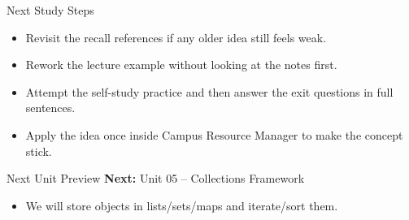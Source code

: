 \documentclass{beamer}
\begin{document}
\begin{frame}{Next Study Steps}
\begin{itemize}[<+->]
  \item Revisit the recall references if any older idea still feels weak.
  \item Rework the lecture example without looking at the notes first.
  \item Attempt the self-study practice and then answer the exit questions in full sentences.
  \item Apply the idea once inside Campus Resource Manager to make the concept stick.
\end{itemize}
  \slidesources{\OOPSUnitIVSources}
\end{frame}

\begin{frame}{Next Unit Preview}
  \textbf{Next:} Unit 05 -- Collections Framework
  \vspace{0.6em}
  \begin{itemize}[<+->]
    \item We will store objects in lists/sets/maps and iterate/sort them.
  \end{itemize}
  \slidesources{\OOPSUnitIVSources}
\end{frame}
\end{document}
